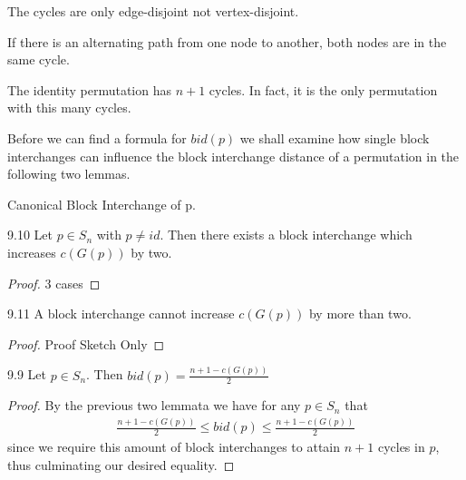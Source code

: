 \begin{remark}
The cycles are only edge-disjoint not vertex-disjoint.
\end{remark}

\begin{remark}
If there is an alternating path from one node to another, both nodes are in the same cycle.
\end{remark}



\begin{remark}
The identity permutation has $n+1$ cycles. In fact, it is the only permutation with this many cycles.
\end{remark}

Before we can find a formula for $bid(p)$ we shall examine how single block interchanges can influence the block interchange distance of a permutation in the following two lemmas.

\begin{definition}
Canonical Block Interchange of p.
\end{definition}

\begin{lemma}
9.10
Let $p \in S_n$ with $p \neq id$. Then there exists a block interchange which increases $c(G(p))$ by two.
\end{lemma}

\begin{proof}
3 cases
\end{proof}

\begin{lemma}
9.11
A block interchange cannot increase $c(G(p))$ by more than two.
\end{lemma}

\begin{proof}
Proof Sketch Only
\end{proof}

\begin{theorem}
9.9
Let $p \in S_n$. Then $bid(p) = \frac{n+1-c(G(p))}{2}$
\end{theorem}

\begin{proof}
By the previous two lemmata we have for any $p \in S_n$ that
\begin{align*}
\frac{n+1-c(G(p))}{2} \leq bid(p) \leq \frac{n+1-c(G(p))}{2}
\end{align*}
since we require this amount of block interchanges to attain $n+1$ cycles in $p$, thus culminating our desired equality.
\end{proof}

